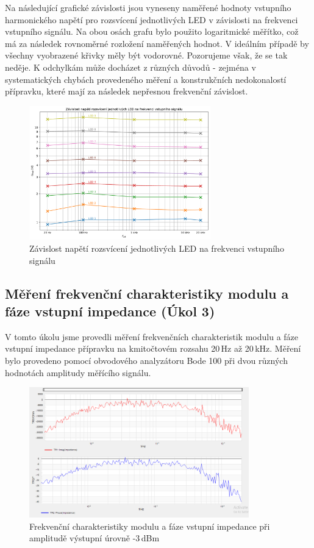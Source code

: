 \documentclass[a4paper, czech]{article}
\begin{document}
Na následující grafické závislosti jsou vyneseny naměřené hodnoty vstupního harmonického napětí pro rozsvícení jednotlivých LED v závislosti na frekvenci vstupního signálu.
Na obou osách grafu bylo použito logaritmické měřítko, což má za následek rovnoměrné rozložení naměřených hodnot.
V ideálním případě by všechny vyobrazené křivky měly být vodorovné.
Pozorujeme však, že se tak neděje.
K odchylkám může docházet z různých důvodů - zejména v systematických chybách provedeného měření a konstrukčních nedokonalostí přípravku, které mají za následek nepřesnou frekvenční závislost.

\begin{figure}[H]
    \centering
    \includegraphics[width=0.7\textwidth]{grafy/graf2.pdf}
    \caption{Závislost napětí rozsvícení jednotlivých LED na frekvenci vstupního signálu}
\end{figure}

\subsection{Měření frekvenční charakteristiky modulu a fáze vstupní impedance (Úkol 3)}

V tomto úkolu jsme provedli měření frekvenčních charakteristik modulu a fáze vstupní impedance přípravku na kmitočtovém rozsahu 20\,Hz až 20\,kHz.
Měření bylo provedeno pomocí obvodového analyzátoru Bode 100 při dvou různých hodnotách amplitudy měřícího signálu.

\begin{figure}[H]
    \centering
    \includegraphics[width=0.85\textwidth]{impedance_uloha8.png}
    \caption{Frekvenční charakteristiky modulu a fáze vstupní impedance při amplitudě výstupní úrovně -3\,dBm}
\end{figure}
\end{document}
